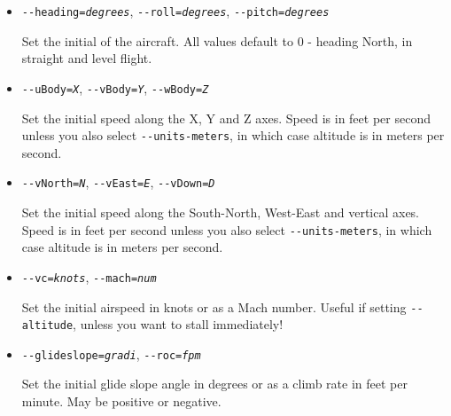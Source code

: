 \begin{itemize}
{\begin{itemize}
  \item{\texttt{-$ $-heading={\it degrees}}, \texttt{-$ $-roll={\it degrees}}, \texttt{-$ $-pitch={\it degrees}}}

  Set the initial  of the aircraft. All values default to 0 - heading North, in straight and level flight.

  \item{\texttt{-$ $-uBody={\it X}}, \texttt{-$ $-vBody={\it Y}}, \texttt{-$ $-wBody={\it Z}}}

  Set the initial speed along the X, Y and Z axes. Speed is in feet per second unless you
  also select \texttt{-$ $-units-meters}, in which case altitude is in meters per second.

  \item{\texttt{-$ $-vNorth={\it N}}, \texttt{-$ $-vEast={\it E}}, \texttt{-$ $-vDown={\it D}}}

  Set the initial speed along the South-North, West-East and vertical axes. Speed is in feet per second unless you
  also select \texttt{-$ $-units-meters}, in which case altitude is in meters per second.

  \item{\texttt{-$ $-vc={\it knots}}, \texttt{-$ $-mach={\it num}}}

  Set the initial airspeed in knots or as a Mach number. Useful if setting \texttt{-$ $-altitude}, unless you want to stall immediately!

  \item{\texttt{-$ $-glideslope={\it gradi}}, \texttt{-$ $-roc={\it fpm}}}

  Set the initial glide slope angle in degrees or as a climb rate in feet per minute. May be positive or negative.

  \end{itemize}
}

\end{itemize}
